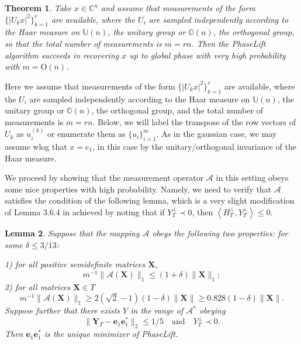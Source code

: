 \documentclass[11pt]{article}
\newtheorem{theorem}{Theorem}[section]
\newtheorem{lemma}[theorem]{Lemma}
\newcommand{\<}{\langle}
\renewcommand{\>}{\rangle}
\newcommand{\cA}{\mathcal{A}}
\newcommand{\bX}{\bm{X}}
\newcommand{\bY}{\bm{Y}}
\newcommand{\be}{\bm{e}}
\numberwithin{equation}{section}
\newcommand{\Tp}{T^\perp}
\begin{document}
\begin{theorem}
Take $x \in \mathbb{C}^n$ and assume that measurements of the form $\{|U_{k}x|^2\}_{k=1}^r$ are available, where the $U_i$ are sampled independently according to the Haar measure on $\mathbb{U}(n)$, the unitary group or $\mathbb{O}(n)$, the orthogonal group, so that the total number of measurements is $m = rn$. Then the PhaseLift algorithm succeeds in recovering $x$ up to global phase with very high probability with $m = \text{O}(n)$. 
\end{theorem}
Here we assume that measurements of the form $\{|U_{k}x|^2\}_{k=1}^r$ are available, where the $U_i$ are sampled independently according to the Haar measure on $\mathbb{U}(n)$, the unitary group or $\mathbb{O}(n)$, the orthogonal group, and the total number of measurements is $m = rn$. Below, we will label the transpose of the row vectors of $U_{k}$ as $u_{i}^{(k)}$ or enumerate them as $\{u_{i}\}_{i=1}^{m}$. As in the gaussian case, we may assume wlog that $x = e_1$, in this case by the unitary/orthogonal invariance of the Haar measure. 

We proceed by showing that the measurement operator $\cA$ in this setting obeys some nice properties with high probability. Namely, we need to verify that $\cA$ satisfies the condition of the following lemma, which is a very slight modification of Lemma 3.6.4 in \cite{CSV} achieved by noting that if $Y_\Tp \prec 0$, then $\left<H_\Tp,Y_\Tp \right> \leq 0$. 
\begin{lemma}
  \label{lem:crucialcomplex2}
  Suppose that the mapping $\cA$ obeys the following two properties:
  for some $\delta \le 3/13$: 
  
  1) for all positive semidefinite matrices $\bX$,
\begin{equation}
\label{eq:RIP1r1C}
m^{-1} \|\cA(\bX)\|_1 \leq (1+\delta) \|\bX\|_{1};
\end{equation}
2) for all matrices $\bX \in T$
\begin{equation}
\label{eq:RIP1r2C}
m^{-1} \|\cA(\bX)\|_1 \geq 2(\sqrt{2}-1)(1-\delta)\|\bX\| \geq
0.828(1-\delta) \|\bX\|.
\end{equation}
Suppose further that there exists $Y$ in the range of $\cA^*$ obeying
\begin{equation}
  \label{eq:dualcertifC}
  \|\bY_T - \be_1 \be_1^*\|_2 \le 1/5 \quad \text{and} \quad Y_\Tp \prec 0.
\end{equation}
Then $\be_1 \be_1^*$ is the unique minimizer of PhaseLift.
\end{lemma}
\end{document}
